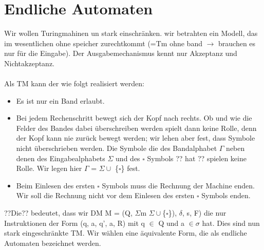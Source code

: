 \section{Endliche Automaten}
Wir wollen Turingmahinen un stark einschränken. 
wir betrahten ein Modell, das im wesentlichen ohne speicher
zurechtkommt (=Tm ohne band $\longrightarrow$  brauchen es nur für die Eingabe).
Der Ausgabemechanismus kennt nur Akzeptanz und Nichtakzeptanz.\\\\
Als TM kann der wie folgt realisiert werden:
\begin{itemize}
    \item Es ist nur ein Band erlaubt.
    \item Bei jedem Rechenschritt bewegt sich der Kopf nach rechts. Ob und wie die Felder des Bandes dabei überschreiben werden spielt dann keine Rolle, denn der Kopf kann nie zurück bewegt werden; wir lehen aber fest, dass Symbole nicht überschrieben werden. Die Symbole die des Bandalphabet $\Gamma $ neben denen des Eingabealphabets $\Sigma $ und des $\square $  Symbols ?? hat ?? spielen keine Rolle. Wir legen hier $\varGamma $ = $\Sigma \cup $ \{$\square $\} fest.
    \item Beim Einlesen des ersten $\square $ Symbols muss die Rechnung der Machine enden. Wir soll die Rechnung nicht vor dem Einlesen des ersten $\square $ Symbols enden. 
\end{itemize}
??Die?? bedeutet, dass wir DM M = (Q, $\Sigma$m $\Sigma\cup $\{$\square $\}), $\delta$, s, F) die nur Instruktionen der Form (q, a, q', a, R) mit q $\in$ Q und a $\in \sigma$ hat.
Dies sind nun stark eingeschränkte TM. Wir wählen eine äquivalente Form, die als endliche Automaten bezeichnet werden. 

